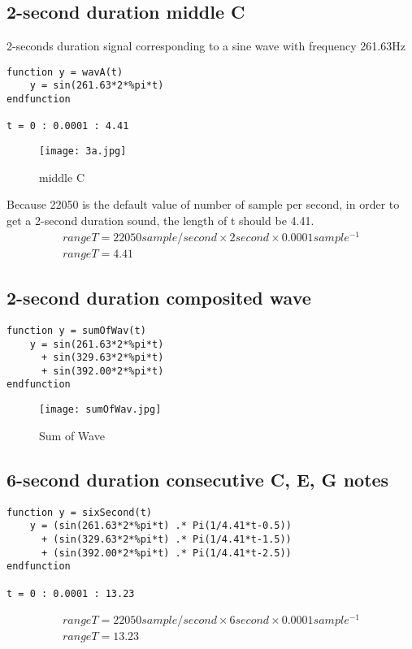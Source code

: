 \documentclass[12pt,fleqn]{article}
\begin{document}
\subsection{2-second duration middle C}
2-seconds duration signal corresponding to a sine wave with frequency 261.63Hz
\begin{lstlisting}[frame=single]
function y = wavA(t)
    y = sin(261.63*2*%pi*t)
endfunction

t = 0 : 0.0001 : 4.41
\end{lstlisting}
\begin{figure}[H]
\centering
\texttt{[image: 3a.jpg]}
\caption{middle C}
\end{figure}
Because 22050 is the default value of number of sample per second, in order to get a 2-second duration sound, the length of t should be 4.41.
\begin{gather}
rangeT = 22050 sample/second \times{} 2 second \times{} 0.0001 sample^{-1}\\
rangeT = 4.41
\end{gather}

\subsection{2-second duration composited wave}
\begin{lstlisting}[frame=single]
function y = sumOfWav(t)
    y = sin(261.63*2*%pi*t)
      + sin(329.63*2*%pi*t)
      + sin(392.00*2*%pi*t)
endfunction
\end{lstlisting}
\begin{figure}[H]
\centering
\texttt{[image: sumOfWav.jpg]}
\caption{Sum of Wave}
\end{figure}

\subsection{6-second duration consecutive C, E, G notes}
\begin{lstlisting}[frame=single]
function y = sixSecond(t)
    y = (sin(261.63*2*%pi*t) .* Pi(1/4.41*t-0.5))
      + (sin(329.63*2*%pi*t) .* Pi(1/4.41*t-1.5))
      + (sin(392.00*2*%pi*t) .* Pi(1/4.41*t-2.5))
endfunction

t = 0 : 0.0001 : 13.23
\end{lstlisting}
\begin{gather}
rangeT = 22050 sample/second \times{} 6 second \times{} 0.0001 sample^{-1}\\
rangeT = 13.23
\end{gather}
\end{document}
